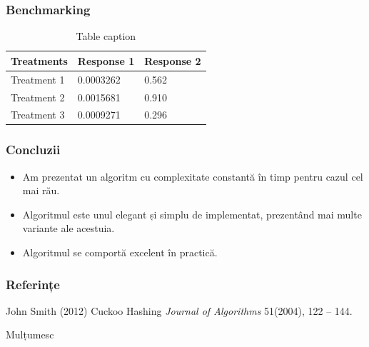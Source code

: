\documentclass{beamer}
\begin{document}
\begin{frame}
\frametitle{Benchmarking}
\begin{table}
\begin{tabular}{l l l}
\toprule
\textbf{Treatments} & \textbf{Response 1} & \textbf{Response 2}\\
\midrule
Treatment 1 & 0.0003262 & 0.562 \\
Treatment 2 & 0.0015681 & 0.910 \\
Treatment 3 & 0.0009271 & 0.296 \\
\bottomrule
\end{tabular}
\caption{Table caption}
\end{table}
\end{frame}
\begin{frame}
\frametitle{Concluzii}
\begin{itemize}

\item Am prezentat un algoritm cu complexitate constantă în timp pentru cazul cel mai rău.

\item Algoritmul este unul elegant și simplu de implementat, prezentând mai multe variante ale acestuia.

\item Algoritmul se comportă excelent în practică.

\end{itemize}
\end{frame}

\begin{frame}
\frametitle{Referințe}
\footnotesize{
\begin{thebibliography}{99} %
 John Smith (2012)
\newblock Cuckoo Hashing
\newblock \emph{Journal of Algorithms} 51(2004), 122 -- 144.
\end{thebibliography}
}
\end{frame}


\begin{frame}
\Huge{\centerline{Mulțumesc}}
\end{frame}

\end{document}
